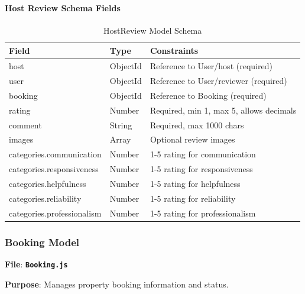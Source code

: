 \documentclass[12pt,a4paper]{article}
\newcommand{\file}[1]{\textbf{\texttt{#1}}}
\begin{document}
\paragraph{Host Review Schema Fields}
\begin{table}[H]
\centering
\small
\begin{tabular}{@{}lll@{}}
\toprule
\textbf{Field} & \textbf{Type} & \textbf{Constraints} \\
\midrule
host & ObjectId & Reference to User/host (required) \\
user & ObjectId & Reference to User/reviewer (required) \\
booking & ObjectId & Reference to Booking (required) \\
rating & Number & Required, min 1, max 5, allows decimals \\
comment & String & Required, max 1000 chars \\
images & Array & Optional review images \\
categories.communication & Number & 1-5 rating for communication \\
categories.responsiveness & Number & 1-5 rating for responsiveness \\
categories.helpfulness & Number & 1-5 rating for helpfulness \\
categories.reliability & Number & 1-5 rating for reliability \\
categories.professionalism & Number & 1-5 rating for professionalism \\
\bottomrule
\end{tabular}
\caption{HostReview Model Schema}
\label{tab:hostreview-schema}
\end{table}

\subsubsection{Booking Model}
\label{subsubsec:booking-model}

\textbf{File}: \file{Booking.js}

\textbf{Purpose}: Manages property booking information and status.
\end{document}
